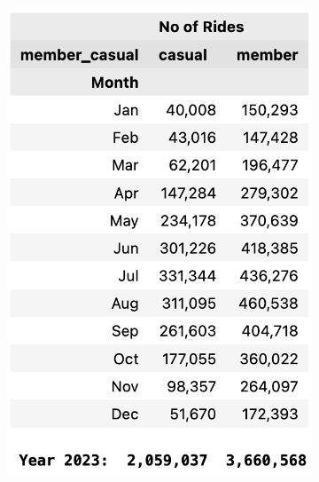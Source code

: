 \documentclass[12pt]{article}
\begin{document}
	\begin{figure}[h]
	\begin{subfigure}{.3\textwidth}
		\includegraphics[scale=0.5]{no_of_rides_per_rider.png} 
	\end{subfigure}
	\begin{subfigure}{.6\textwidth}
	\hspace{-0.35in}

\end{subfigure}
\end{figure}
\end{document}
